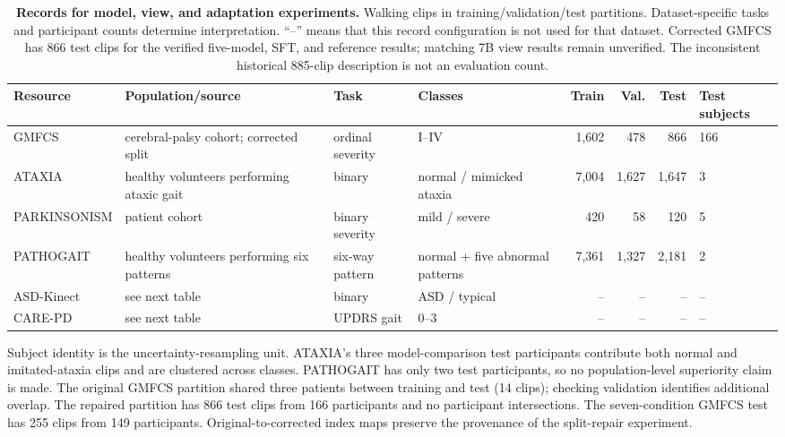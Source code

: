 \begin{table}[H]
\centering
\caption{\textbf{Records for model, view, and adaptation experiments.} Walking clips in training/validation/test partitions. Dataset-specific tasks and participant counts determine interpretation. ``--'' means that this record configuration is not used for that dataset. Corrected GMFCS has 866 test clips for the verified five-model, SFT, and reference results; matching 7B view results remain unverified. The inconsistent historical 885-clip description is not an evaluation count.}
\label{tab:core_resources}
\small
\setlength{\tabcolsep}{3.5pt}
\begin{adjustbox}{max width=\textwidth}
\begin{tabular}{llllrrrl}
\toprule
Resource & Population/source & Task & Classes & Train & Val. & Test & Test subjects \\
\midrule
GMFCS & cerebral-palsy cohort; corrected split & ordinal severity & I--IV & 1,602 & 478 & 866 & 166 \\
ATAXIA & healthy volunteers performing ataxic gait & binary & normal / mimicked ataxia & 7,004 & 1,627 & 1,647 & 3 \\
PARKINSONISM & patient cohort & binary severity & mild / severe & 420 & 58 & 120 & 5 \\
PATHOGAIT & healthy volunteers performing six patterns & six-way pattern & normal + five abnormal patterns & 7,361 & 1,327 & 2,181 & 2 \\
ASD-Kinect & see next table & binary & ASD / typical & -- & -- & -- & -- \\
CARE-PD & see next table & UPDRS gait & 0--3 & -- & -- & -- & -- \\
\bottomrule
\end{tabular}
\end{adjustbox}
\end{table}

Subject identity is the uncertainty-resampling unit. ATAXIA's three model-comparison test participants contribute both normal and imitated-ataxia clips and are clustered across classes. PATHOGAIT has only two test participants, so no population-level superiority claim is made. The original GMFCS partition shared three patients between training and test (14 clips); checking validation identifies additional overlap. The repaired partition has 866 test clips from 166 participants and no participant intersections. The seven-condition GMFCS test has 255 clips from 149 participants. Original-to-corrected index maps preserve the provenance of the split-repair experiment.


